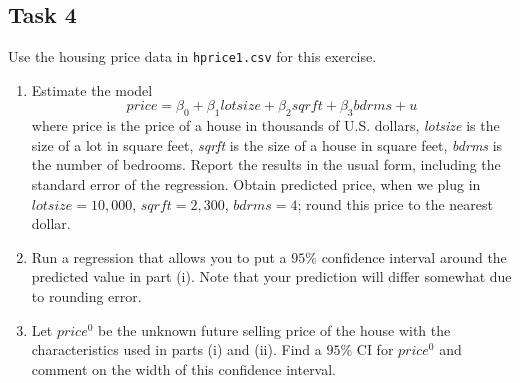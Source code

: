 \documentclass[10pt,a4paper]{amsart}
\begin{document}
\subsection*{Task 4}
Use the housing price data in \texttt{hprice1.csv} for this exercise.
\begin{enumerate}
      \item Estimate the model
            \[price = \beta_0 + \beta_1 lotsize + \beta_2 sqrft + \beta_3 bdrms + u\]
            where price is the price of a house in thousands of U.S. dollars, \textit{lotsize} is the
            size of a lot in square feet, \textit{sqrft} is the size of a house in square feet,
            \textit{bdrms} is the number of bedrooms. Report the results in the usual form, including
            the standard error of the regression. Obtain predicted price, when we plug in
            $ lotsize = 10,000 $, $ sqrft = 2,300 $, $ bdrms = 4 $; round this price to the nearest dollar.
      \item Run a regression that allows you to put a $ 95\% $  confidence interval around the predicted
            value in part (i). Note that your prediction will differ somewhat due to rounding error.
      \item Let $ price^{0} $ be the unknown future selling price of the house with the characteristics
            used in parts (i) and (ii). Find a $ 95\% $  CI for $ price^{0} $ and comment on the width of
            this confidence interval.
\end{enumerate}
\end{document}
